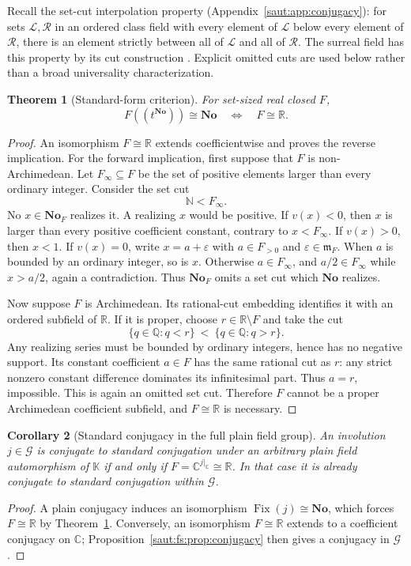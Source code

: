 \documentclass[11pt]{article}
\newtheorem{theorem}{Theorem}[section]
\newtheorem{corollary}[theorem]{Corollary}
\theoremstyle{definition}
\theoremstyle{remark}
\newcommand{\No}{\mathbf{No}}
\newcommand{\R}{\mathbb R}
\newcommand{\C}{\mathbb C}
\newcommand{\Q}{\mathbb Q}
\newcommand{\N}{\mathbb N}
\newcommand{\K}{\mathbb K}
\newcommand{\mm}{\mathfrak m}
\newcommand{\Fix}{\operatorname{Fix}}
\numberwithin{equation}{section}
\begin{document}
Recall the set-cut interpolation property (Appendix~\ref{saut:app:conjugacy}): for
sets $\mathcal L,\mathcal R$ in an ordered class field with every element of $\mathcal
L$ below every element of $\mathcal R$, there is an element strictly between all of
$\mathcal L$ and all of $\mathcal R$. The surreal field has this property by its cut
construction \cite{Conway}. Explicit omitted cuts are used below rather than a broad
universality characterization.

\begin{theorem}[Standard-form criterion]\label{saut:fs:thm:No-criterion}
For set-sized real closed $F$,
\[
 F((t^{\No}))\cong\No\quad\Longleftrightarrow\quad F\cong\R.
\]
\end{theorem}
\begin{proof}
An isomorphism $F\cong\R$ extends coefficientwise and proves the reverse
implication. For the forward implication, first suppose that $F$ is
non-Archimedean. Let $F_\infty\subseteq F$ be the set of positive elements larger
than every ordinary integer. Consider the set cut
\[
 \N<F_\infty.
\]
No $x\in\No_F$ realizes it. A realizing $x$ would be positive. If $v(x)<0$, then $x$
is larger than every positive coefficient constant, contrary to $x<F_\infty$. If
$v(x)>0$, then $x<1$. If $v(x)=0$, write $x=a+\varepsilon$ with $a\in F_{>0}$ and
$\varepsilon\in\mm_F$. When $a$ is bounded by an ordinary integer, so is $x$.
Otherwise $a\in F_\infty$, and $a/2\in F_\infty$ while $x>a/2$, again a
contradiction. Thus $\No_F$ omits a set cut which $\No$ realizes.

Now suppose $F$ is Archimedean. Its rational-cut embedding identifies it with an
ordered subfield of $\R$. If it is proper, choose $r\in\R\setminus F$ and take the cut
\[
 \{q\in\Q:q<r\}\ <\ \{q\in\Q:q>r\}.
\]
Any realizing series must be bounded by ordinary integers, hence has no negative
support. Its constant coefficient $a\in F$ has the same rational cut as $r$: any
strict nonzero constant difference dominates its infinitesimal part. Thus $a=r$,
impossible. This is again an omitted set cut. Therefore $F$ cannot be a proper
Archimedean coefficient subfield, and $F\cong\R$ is necessary.
\end{proof}

\begin{corollary}[Standard conjugacy in the full plain field group]\label{saut:fs:cor:standard-conj}
An involution $j\in\mathcal G$ is conjugate to standard conjugation under an arbitrary
plain field automorphism of $\K$ if and only if $F=\C^{j|_\C}\cong\R$. In that case it
is already conjugate to standard conjugation within $\mathcal G$.
\end{corollary}
\begin{proof}
A plain conjugacy induces an isomorphism $\Fix(j)\cong\No$, which forces $F\cong\R$
by Theorem~\ref{saut:fs:thm:No-criterion}. Conversely, an isomorphism $F\cong\R$
extends to a coefficient conjugacy on $\C$; Proposition~\ref{saut:fs:prop:conjugacy}
then gives a conjugacy in $\mathcal G$.
\end{proof}
\end{document}
